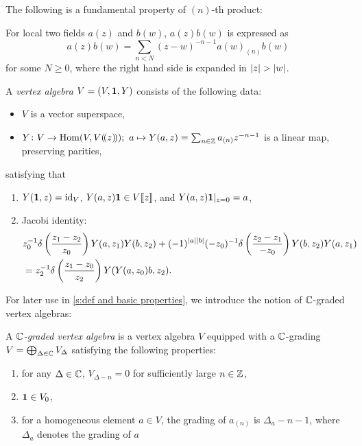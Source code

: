\documentclass[final,reqno]{amsart}
\begin{document}
The following is a fundamental property of $(n)$-th product:
\begin{prp}\label{prp:fundamental property of n-th product}
    For local two fields $a(z)$ and $b(w)$, $a(z)b(w)$ is expressed as
    \[
        a(z)b(w)=\sum_{n<N}(z-w)^{-n-1}a(w)_{(n)}b(w)
    \]
    for some $N\geq 0$, where the right hand side is expanded in $\abs{z}>\abs{w}$. 
\end{prp}

\begin{dfn}
    A \emph{vertex algebra} $V=(V,\mathbf{1},Y)$ consists of the following data:
    \begin{itemize}
        \item 
        $V$ is a vector superspace,
        \item 
        $Y\colon V\to \operatorname{Hom}(V,V(\!( z )\!));\ a\mapsto Y(a,z)=\sum_{n\in\mathbb{Z}}a_{(n)}z^{-n-1}$ is a linear map, preserving parities, 
    \end{itemize}
    satisfying that
    \begin{enumerate}[series=axiomva]
        \item 
        $Y(\mathbf{1},z)=\operatorname{id}_V$, $Y(a,z)\mathbf{1}\in V\llbracket z \rrbracket$, and $Y(a,z)\mathbf{1}|_{z=0}=a$,
        \item 
        Jacobi identity:
        \[
        \begin{split}
            &z_0^{-1}\delta\left(\frac{z_1-z_2}{z_0}\right)Y(a,z_1)Y(b,z_2)+(-1)^{\left| a \right|\left| b \right|}(-z_0)^{-1}\delta\left(\frac{z_2-z_1}{-z_0}\right)Y(b,z_2)Y(a,z_1)\\
            &=z_2^{-1}\delta\left(\frac{z_1-z_0}{z_2}\right)Y(Y(a,z_0)b,z_2).
        \end{split}
        \]
    \end{enumerate}
\end{dfn}

For later use in \cref{s:def and basic properties}, we introduce the notion of $\mathbb{C}$-graded vertex algebras:
\begin{dfn}
    A \emph{$\mathbb{C}$-graded vertex algebra} is a vertex algebra $V$ equipped with a $\mathbb{C}$-grading $V=\bigoplus_{\Delta\in\mathbb{C}}V_\Delta$ satisfying the following properties:
    \begin{enumerate}[resume=axiomva]
        \item 
        for any $\Delta\in\mathbb{C}$, $V_{\Delta-n}=0$ for sufficiently large $n\in\mathbb{Z}$,
        \item
        $\mathbf{1}\in V_0$,
        \item
        for a homogeneous element $a\in V$, the grading of $a_{(n)}$ is $\Delta_a-n-1$, where $\Delta_a$ denotes the grading of $a$
    \end{enumerate}
\end{dfn}
\end{document}
